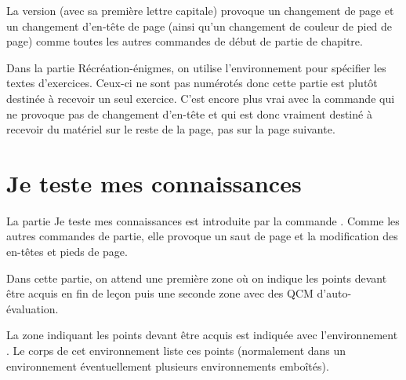 \documentclass[nocrop]{sesamanuel}
\begin{document}
\recreation

La version  (avec sa première lettre capitale)
provoque un changement de page et un changement d'en-tête de page
(ainsi qu'un changement de couleur de pied de page) comme toutes les
autres commandes de début de partie de chapitre.

Dans la partie Récréation-énigmes, on utilise l'environnement
 pour spécifier les textes d'exercices. Ceux-ci ne sont
pas numérotés donc cette partie est plutôt destinée à recevoir un seul
exercice. C'est encore plus vrai avec la commande  qui
ne provoque pas de changement d'en-tête et qui est donc vraiment
destiné à recevoir du matériel sur le reste de la page, pas sur la
page suivante.

\clearpage
\section{Je teste mes connaissances}
\label{sec-je-teste-mes-connaissances}
La partie Je teste mes connaissances est introduite par la commande
. Comme les autres commandes de partie, elle
provoque un saut de page et la modification des en-têtes et pieds de
page.
\renewcommand{\StringDOCUMENTATION}{\`A la fin du chapitre je dois être capable de}
\begin{documentation}
Dans cette partie, on attend une première zone où on indique les
points devant être acquis en fin de leçon puis une seconde zone avec
des QCM d'auto-évaluation.

La zone indiquant les points devant être acquis est indiquée avec
l'environnement . Le corps de cet environnement liste
ces points (normalement dans un environnement 
éventuellement plusieurs environnements emboîtés).
\end{documentation}
\end{document}
